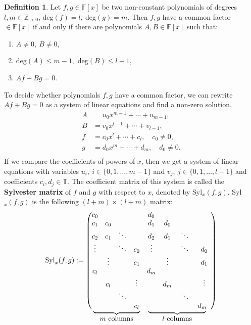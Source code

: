\documentclass[thesis=M,english]{FITthesis}[2012/10/20]
\theoremstyle{remark}
\theoremstyle{definition}
\newtheorem{DF}{Definition}[section]
\newcommand\coolunder[2]{\mathrlap{\smash{\underbrace{\phantom{%
    \begin{matrix} #2 \end{matrix}}}_{\mbox{$#1$}}}}#2}
\begin{document}
\begin{DF}
Let $f,g \in \mathbb{F}[x]$ be two non-constant polynomials of degrees $l,m \in \mathbb{Z}_{>0}$, deg$(f) = l,\ $deg$(g)=m$. Then $f,g$ have a common factor $\in \mathbb{F}[x]$ if and only if there are polynomials $A,B \in \mathbb{F}[x]$ such that:
\begin{enumerate}
\item $A \neq 0,\ B \neq 0,$ 
\item deg$(A) \leq m - 1,$ deg$(B) \leq l - 1,$
\item $Af  + Bg = 0.$
\end{enumerate}
\noindent To decide whether polynomials $f,g$ have a common factor, we can rewrite $Af  + Bg = 0$ as a system of linear equations and find a non-zero solution.
\begin{align*}
A &= u_0x^{m-1} + \cdots + u_{m-1}, \\
B &= v_0x^{l-1} + \cdots + v_{l-1}, \\
f &= c_0x^l + \cdots + c_l, \quad c_0 \neq 0, \\
g &= d_0x^m + \cdots + d_m, \quad d_0 \neq 0. \\
\end{align*}
If we compare the coefficients of powers of $x$, then we get a system of linear equations with variables $u_i,\ i \in \{0,1,\ldots	, m - 1\}$ and $v_j,\ j \in \{0,1,\ldots, l - 1\}$ and coefficients $c_i, d_j \in \mathbb{T}.$ The coefficient matrix of this system is called the \textbf{Sylvester matrix} of $f$ and $g$ with respect to $x$, denoted by Syl$_{x}(f,g)$. Syl$_{x}(f,g)$ is the following $(l + m) \times (l + m)$ matrix:
$$
\text{Syl}_{x}(f,g) := \begin{pmatrix}
c_0 &  &  &  &             d_0 &  &  &  \\
c_1 & c_0 &  &  &        d_1 & d_0 &   &  \\
c_2 & c_1 & \ddots &  & d_2 & d_1 & \ddots  &  \\
\vdots & & \ddots & c_0 & \vdots &  & \ddots & d_0 \\
 &  \vdots &  & c_1 &  & \vdots &  & d_1 \\
c_l &  &  &  &  d_m&  &  & \\
 & c_l &  & \vdots &  & d_m &  & \vdots \\
 &  & \ddots &  &  &  & \ddots &  \\
\coolunder{m \text{ columns}}{\hphantom{..} & \hphantom{...} & \hphantom{..}  & c_l & }\coolunder{l \text{ columns}}{\hphantom{...} & \hphantom{...} & \hphantom{......} & d_m \hphantom{..}} \\

\end{pmatrix}$$
\end{DF}
\end{document}
